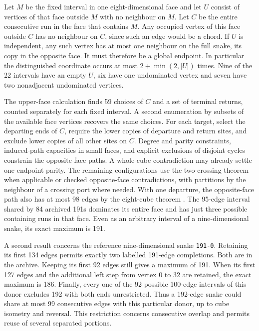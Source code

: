 \documentclass[11pt,a4paper]{article}
\theoremstyle{definition}
\theoremstyle{remark}
\begin{document}
Let \(M\) be the fixed interval in one eight-dimensional face and let \(U\) consist of vertices of that face outside \(M\) with no neighbour on \(M\). Let \(C\) be the entire consecutive run in the face that contains \(M\). Any occupied vertex of this face outside \(C\) has no neighbour on \(C\), since such an edge would be a chord. If \(U\) is independent, any such vertex has at most one neighbour on the full snake, its copy in the opposite face. It must therefore be a global endpoint. In particular the distinguished coordinate occurs at most \(2+\min(2,|U|)\) times. Nine of the 22 intervals have an empty \(U\), six have one undominated vertex and seven have two nonadjacent undominated vertices.

The upper-face calculation finds 59 choices of \(C\) and a set of terminal returns, counted separately for each fixed interval. A second enumeration by subsets of the available face vertices recovers the same choices. For each target, select the departing ends of \(C\), require the lower copies of departure and return sites, and exclude lower copies of all other sites on \(C\). Degree and parity constraints, induced-path capacities in small faces, and explicit exclusions of disjoint cycles constrain the opposite-face paths. A whole-cube contradiction may already settle one endpoint parity. The remaining configurations use the two-crossing theorem when applicable or checked opposite-face contradictions, with partitions by the neighbour of a crossing port where needed. With one departure, the opposite-face path also has at most 98 edges by the eight-cube theorem \cite{ostergard}. The 95-edge interval shared by 84 archived 191s dominates its entire face and has just three possible containing runs in that face. Even as an arbitrary interval of a nine-dimensional snake, its exact maximum is 191.

A second result concerns the reference nine-dimensional snake \texttt{191-0}. Retaining its first 134 edges permits exactly two labelled 191-edge completions. Both are in the archive. Keeping its first 92 edges still gives a maximum of 191. When its first 127 edges and the additional left step from vertex 0 to 32 are retained, the exact maximum is 186. Finally, every one of the 92 possible 100-edge intervals of this donor excludes 192 with both ends unrestricted. Thus a 192-edge snake could share at most 99 consecutive edges with this particular donor, up to cube isometry and reversal. This restriction concerns consecutive overlap and permits reuse of several separated portions.
\end{document}
